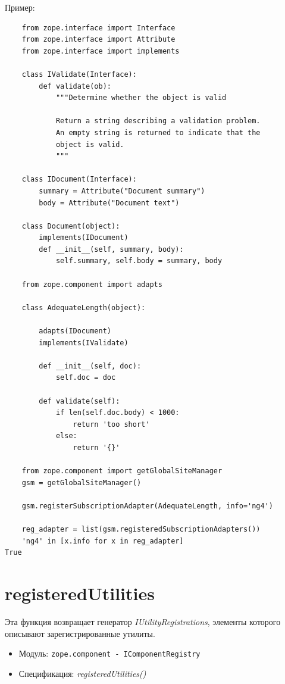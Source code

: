 \documentclass[a4paper,openany,twoside,draft]{book}
\providecommand*{\DUroletitlereference}[1]{\textsl{#1}}
\begin{document}
Пример:

\begin{verbatim}
    from zope.interface import Interface
    from zope.interface import Attribute
    from zope.interface import implements

    class IValidate(Interface):
        def validate(ob):
            """Determine whether the object is valid

            Return a string describing a validation problem.
            An empty string is returned to indicate that the
            object is valid.
            """

    class IDocument(Interface):
        summary = Attribute("Document summary")
        body = Attribute("Document text")

    class Document(object):
        implements(IDocument)
        def __init__(self, summary, body):
            self.summary, self.body = summary, body

    from zope.component import adapts

    class AdequateLength(object):

        adapts(IDocument)
        implements(IValidate)

        def __init__(self, doc):
            self.doc = doc

        def validate(self):
            if len(self.doc.body) < 1000:
                return 'too short'
            else:
                return '{}'

    from zope.component import getGlobalSiteManager
    gsm = getGlobalSiteManager()

    gsm.registerSubscriptionAdapter(AdequateLength, info='ng4')

    reg_adapter = list(gsm.registeredSubscriptionAdapters())
    'ng4' in [x.info for x in reg_adapter]
True
\end{verbatim}


\section*{registeredUtilities%
  \label{registeredutilities}%
}

Эта функция возвращает генератор \DUroletitlereference{IUtilityRegistrations}, элементы которого описывают зарегистрированные утилиты.

\begin{itemize}

\item Модуль: \texttt{zope.component - IComponentRegistry}

\item Спецификация: \DUroletitlereference{registeredUtilities()}

\end{itemize}
\end{document}
